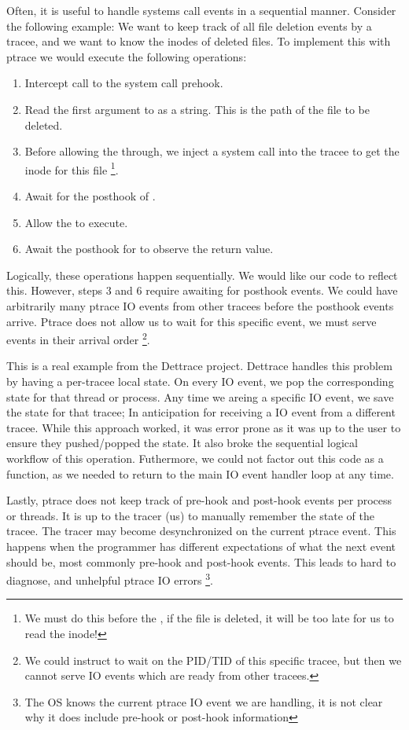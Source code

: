 \begin{compactitem}
    Often, it is useful to handle systems call events in a sequential manner. Consider the following example: We want to keep track of all file deletion events by a tracee, and we want to know the inodes of deleted files. To implement this with ptrace we would execute the following operations:
    \begin{enumerate}
    \item Intercept call to the  system call prehook.
    \item Read the first argument to  as a string. This is the path of the file to be deleted.
    \item Before allowing the  through, we inject a  system call into the tracee to get the inode for this file \footnote{We must do this before the , if the file is deleted, it will be too late for us to read the inode!}.
    \item Await for the posthook of .
    \item Allow the  to execute.
    \item Await the posthook for  to observe the return value.
    \end{enumerate}
    
    Logically, these operations happen sequentially. We would like our code to reflect this. However, steps 3 and 6 require awaiting for posthook events. We could have arbitrarily many ptrace IO events from other tracees before the posthook events arrive. Ptrace does not allow us to wait for this specific event, we must serve events in their arrival order \footnote{We could instruct  to wait on the PID/TID of this specific tracee, but then we cannot serve IO events which are ready from other tracees.}.
    
    This is a real example from the Dettrace project. Dettrace handles this problem by having a per-tracee local state. On every IO event, we pop the corresponding state for that thread or process. Any time we areing a specific IO event, we save the state for that tracee; In anticipation for receiving a IO event from a different tracee. While this approach worked, it was error prone as it was up to the user to ensure they pushed/popped the state. It also broke the sequential logical workflow of this operation. Futhermore, we could not factor out this code as a function, as we needed to return to the main IO event handler loop at any time.
    
    Lastly, ptrace does not keep track of pre-hook and post-hook events per process or threads. It is up to the tracer (us) to manually remember the state of the tracee. The tracer may become desynchronized on the current ptrace event. This happens when the programmer has different expectations of what the next event should be, most commonly pre-hook and post-hook events. This leads to hard to diagnose, and unhelpful  ptrace IO errors \footnote{The OS knows the current ptrace IO event we are handling, it is not clear why it does include pre-hook or post-hook information}.


\end{compactitem}

